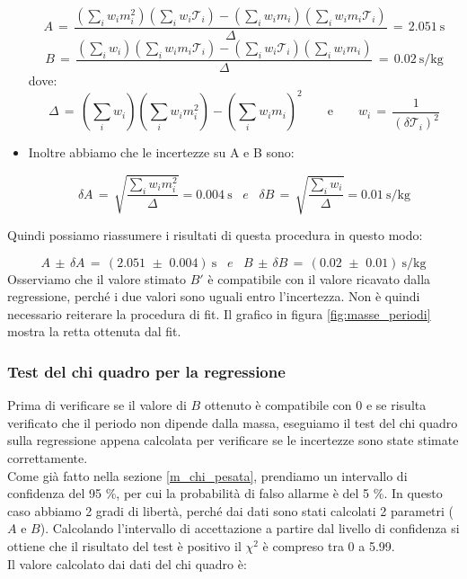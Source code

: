 \begin{itemize}
{			\begin{equation*}
				A \,=\, \frac{(\sum_i w_i m_i^2)(\sum_i w_i \mathcal{T}_i) - (\sum_i w_i m_i)(\sum_i w_i m_i \mathcal{T}_i)}{\Delta}
                \,=\, \SI{2.051}{\second}
			\end{equation*}
			\begin{equation*}
				B \,=\, \frac{(\sum_i w_i)(\sum_i w_i m_i \mathcal{T}_i) - (\sum_i w_i \mathcal{T}_i)(\sum_i w_i m_i)}{\Delta}
                \,=\, \SI{0.02}{\second\per\kilo\gram}
			\end{equation*}
			dove:
			\begin{equation*}
				\Delta \,=\, (\sum_i w_i)(\sum_i w_i m_i^2) - (\sum_i w_i m_i)^2 \qquad \text{e} \qquad
				w_i \,=\, \frac{1}{(\delta \mathcal{T}_i)^2}
			\end{equation*}}
	\item{Inoltre abbiamo che le incertezze su A e B sono:

			\begin{equation*}
				\delta A \,=\, \sqrt{\frac{\sum_i w_i m_i^2}{\Delta}} = \SI{0.004}{\second}  \,\,\,\,\, e \,\,\,\,\,
				\delta B \,=\, \sqrt{\frac{\sum_i w_i}{\Delta}} = \SI{0.01}{\second\per\kilo\gram}
			\end{equation*}}
	\end{itemize} 
	Quindi possiamo riassumere i risultati di questa procedura in questo modo:

	\begin{equation*}
		A \,\pm\, \delta A \,=\, (2.051 \,\, \pm \,\, 0.004) \: \si{\second} \,\,\,\,\, e \,\,\,\,\,
		B \,\pm\, \delta B \,=\, (0.02 \,\, \pm \,\, 0.01) \: \si{\second\per\kilo\gram}
	\end{equation*}
    Osserviamo che il valore stimato $B'$ è compatibile con il valore ricavato dalla regressione, perché i due valori
    sono uguali entro l'incertezza. Non è quindi necessario reiterare la procedura di fit.
    Il grafico in figura \ref{fig:masse_periodi} mostra la retta ottenuta dal fit.

\subsubsection{Test del chi quadro per la regressione}

Prima di verificare se il valore di $B$ ottenuto è compatibile con 0 e se risulta verificato che il periodo non dipende dalla massa,
eseguiamo il test del chi quadro sulla regressione appena calcolata per verificare se le incertezze sono state stimate correttamente.\\
%
Come già fatto nella sezione \ref{m_chi_pesata}, prendiamo un intervallo di confidenza del 95 \%, per cui la probabilità di falso allarme
è del 5 \%. In questo caso abbiamo 2 gradi di libertà, perché dai dati sono stati calcolati 2 parametri ($A$ e $B$). Calcolando l'intervallo
di accettazione a partire dal livello di confidenza si ottiene che il risultato del test è positivo il $\chi^2$ è compreso tra 0 a 5.99. \\
%
Il valore calcolato dai dati del chi quadro è:

